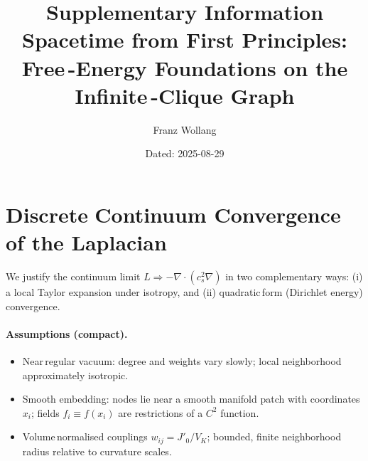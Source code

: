 \documentclass[11pt]{article}
\title{Supplementary Information\\Spacetime from First Principles: Free\mbox{\,-}Energy Foundations on the Infinite\mbox{\,-}Clique Graph}
\author[ ]{Franz Wollang}
\affil[ ]{\small Independent Researcher}
\date{\small Dated: 2025-08-29}
\begin{document}
\maketitle

\pagestyle{fancy}
\fancyhf{}
\renewcommand{\headrulewidth}{0pt}
\renewcommand{\footrulewidth}{0pt}

\begin{center}
\setlength{\fboxsep}{8pt}%
\end{center}
\vspace{1em}

\tableofcontents
\vspace{1em}
\vspace{1em}


\section{Discrete\,\textrightarrow\,Continuum Convergence of the Laplacian}\label{si:disc-cont-conv}
We justify the continuum limit $L \Rightarrow -\nabla\!\cdot(c_s^2\nabla)$ in two complementary ways: (i) a local Taylor expansion under isotropy, and (ii) quadratic\,form (Dirichlet energy) convergence.

\paragraph{Assumptions (compact).}
\begin{itemize}[leftmargin=*]
  \item Near\,regular vacuum: degree and weights vary slowly; local neighborhood approximately isotropic.
  \item Smooth embedding: nodes lie near a smooth manifold patch with coordinates $x_i$; fields $f_i\equiv f(x_i)$ are restrictions of a $C^2$ function.
  \item Volume\,normalised couplings $w_{ij}=J'_0/V_K$; bounded, finite neighborhood radius relative to curvature scales.
\end{itemize}
\end{document}
